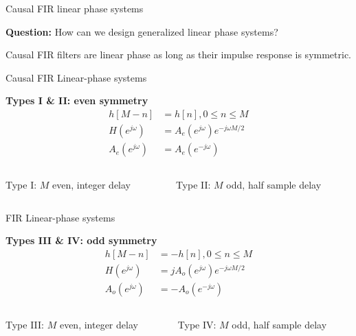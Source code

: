 \documentclass[10pt, handout]{beamer}
\begin{document}
\begin{frame}{Causal FIR linear phase systems}
	
	\textbf{Question:} How can we design generalized linear phase systems?
	
	\pause
	
	Causal FIR filters are linear phase as long as their impulse response is symmetric.

\end{frame}

\begin{frame}{Causal FIR Linear-phase systems}

\textbf{Types I \& II: even symmetry}
\begin{align}
h[M-n] &= h[n], 0 \leq n \leq M \tag{even symmetry} \\
H(e^{j\omega}) &= A_e(e^{j\omega})e^{-j\omega M/2} \tag{Delay of $M/2$} \\
A_e(e^{j\omega}) &= A_e(e^{-j\omega}) \tag{due to even symmetry}
\end{align}

\begin{columns}
	\begin{column}{0.5\textwidth}
		Type I: $M$ even, integer delay
	\end{column}
	\begin{column}{0.5\textwidth}
		Type II: $M$ odd, half sample delay
	\end{column}
\end{columns}

\begin{center}
	\resizebox{\linewidth}{!}{}
\end{center}

\end{frame}

\begin{frame}{FIR Linear-phase systems}

\textbf{Types III \& IV: odd symmetry}
\begin{align}
h[M-n] &= -h[n], 0 \leq n \leq M \tag{odd symmetry} \\
H(e^{j\omega}) &= jA_o(e^{j\omega})e^{-j\omega M/2} \tag{Delay of $M/2$} \\
A_o(e^{j\omega}) &= -A_o(e^{-j\omega}) \tag{due to odd symmetry}
\end{align}

\begin{columns}
	\begin{column}{0.5\textwidth}
		Type III: $M$ even, integer delay
	\end{column}
	\begin{column}{0.5\textwidth}
		Type IV: $M$ odd, half sample delay
	\end{column}
\end{columns}

\begin{center}
	\resizebox{\linewidth}{!}{}
\end{center}

\end{frame}
\end{document}
